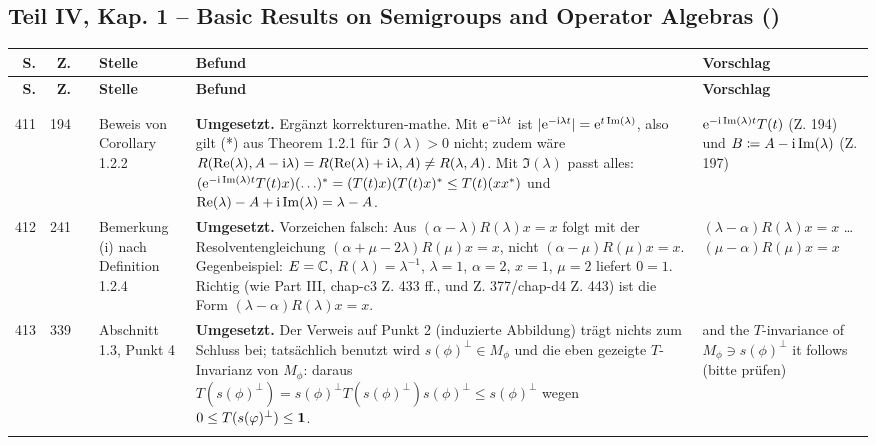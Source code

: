 \documentclass[10pt]{article}
\begin{document}
\subsection*{Teil IV, Kap. 1 – Basic Results on Semigroups and Operator Algebras ()}
\begin{longtable}{@{}rrc>{\RaggedRight\arraybackslash}p{3.0cm}>{\RaggedRight\arraybackslash}p{11.4cm}>{\RaggedRight\arraybackslash}p{7.4cm}@{}}
\toprule
\textbf{S.} & \textbf{Z.} & \textbf{} & \textbf{Stelle} & \textbf{Befund} & \textbf{Vorschlag} \\
\midrule
\endfirsthead
\toprule
\textbf{S.} & \textbf{Z.} & \textbf{} & \textbf{Stelle} & \textbf{Befund} & \textbf{Vorschlag} \\
\midrule
\endhead
\bottomrule
\endlastfoot
41 &  &  &  &  &  \\[2pt]
 &  &  &  &  &  \\[2pt]
411 & 194 & \sichA{} & Beweis von Corollary 1.2.2 & \textbf{Umgesetzt.} Ergänzt korrekturen-mathe. Mit $\mathrm{e}^{-\mathrm{i}\lambda t}$ ist $\vert\mathrm{e}^{-\mathrm{i}\lambda t}\vert = \mathrm{e}^{t\mathop{}\!\mathrm{Im}(\lambda)}$, also gilt (*) aus Theorem 1.2.1 für $\Im(\lambda) > 0$ nicht; zudem wäre $R(\mathop{}\!\mathrm{Re}(\lambda),A-\mathrm{i}\lambda) = R(\mathop{}\!\mathrm{Re}(\lambda)+\mathrm{i}\lambda,A) \neq R(\lambda,A)$. Mit $\Im(\lambda)$ passt alles: $(\eu^{-\im\Im(\lambda)t}T(t)x)(\ldots)^{*} = (T(t)x)(T(t)x)^{*} \leq T(t)(xx^{*})$ und $\mathop{}\!\mathrm{Re}(\lambda) - A + \mathrm{i}\mathop{}\!\mathrm{Im}(\lambda) = \lambda - A$. & $\mathrm{e}^{-\mathrm{i}\mathop{}\!\mathrm{Im}(\lambda)t}T(t)$ (Z. 194) und $B \coloneq A - \mathrm{i}\mathop{}\!\mathrm{Im}(\lambda)$ (Z. 197) \\[2pt]
412 & 241 & \sichA{} & Bemerkung (i) nach Definition 1.2.4 & \textbf{Umgesetzt.} Vorzeichen falsch: Aus $(\alpha - \lambda)R(\lambda)x = x$ folgt mit der Resolventengleichung $(\alpha + \mu - 2\lambda)R(\mu)x = x$, nicht $(\alpha - \mu)R(\mu)x = x$. Gegenbeispiel: $E = \mathbb{C}$, $R(\lambda) = \lambda^{-1}$, $\lambda = 1$, $\alpha = 2$, $x = 1$, $\mu = 2$ liefert $0 = 1$. Richtig (wie Part III, chap-c3 Z. 433 ff., und Z. 377/chap-d4 Z. 443) ist die Form $(\lambda-\alpha)R(\lambda)x = x$. & $(\lambda - \alpha)R(\lambda)x = x$ \dots{} $(\mu - \alpha)R(\mu)x = x$ \\[2pt]
413 & 339 & \sichC{} & Abschnitt 1.3, Punkt 4 & \textbf{Umgesetzt.} Der Verweis auf Punkt 2 (induzierte Abbildung) trägt nichts zum Schluss bei; tatsächlich benutzt wird $s(\phi)^{\perp} \in M_{\phi}$ und die eben gezeigte $T$-Invarianz von $M_{\phi}$: daraus $T(s(\phi)^{\perp}) = s(\phi)^{\perp}T(s(\phi)^{\perp})s(\phi)^{\perp} \leq s(\phi)^{\perp}$ wegen $0 \leq T(s(\phi)^{\perp}) \leq \1$. & {and the $T$-invariance of $M_{\phi} \ni s(\phi)^{\perp}$ it follows} (bitte prüfen) \\[2pt]
 &  &  &  &  &  \\
\end{longtable}
\end{document}
